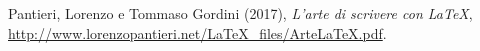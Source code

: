 \begin{thebibliography}{9}
    Pantieri, Lorenzo e Tommaso Gordini (2017),
    \emph{L’arte di scrivere con \LaTeX},
    \url{http://www.lorenzopantieri.net/LaTeX_files/ArteLaTeX.pdf}.
\end{thebibliography}
    